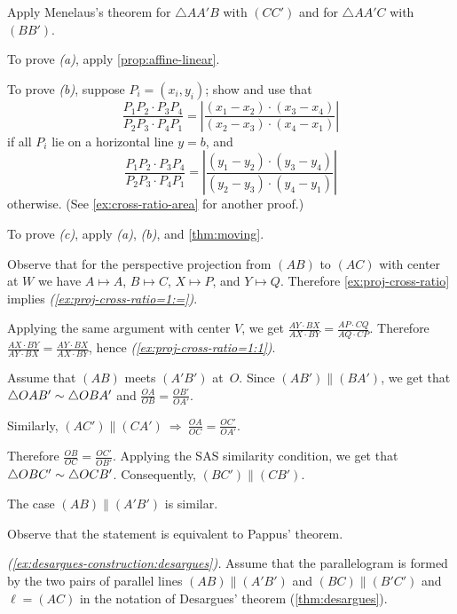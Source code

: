  Apply Menelaus's theorem
for $\triangle AA'B$ with $(CC')$
and
for $\triangle AA'C$ with $(BB')$.

\setcounter{eqtn}{0}

To prove \textit{(a)}, apply \ref{prop:affine-linear}.

To prove \textit{(b)}, suppose $P_i=(x_i,y_i)$;
show and use that 
\[\frac{P_1P_2\cdot P_3P_4}{P_2P_3\cdot P_4P_1}
=\left|\frac{(x_1-x_2)\cdot(x_3-x_4)}{(x_2-x_3)\cdot (x_4-x_1)}\right|\]
if all $P_i$ lie on a horizontal line $y=b$, and
\[\frac{P_1P_2\cdot P_3P_4}{P_2P_3\cdot P_4P_1}
=\left|\frac{(y_1-y_2)\cdot(y_3-y_4)}{(y_2-y_3)\cdot (y_4-y_1)}\right|\]
otherwise. (See \ref{ex:cross-ratio-area} for another proof.)

To prove \textit{(c)}, apply \textit{(a)}, \textit{(b)}, and \ref{thm:moving}.

Observe that for the perspective projection from $(AB)$ to $(AC)$ with center at $W$ we have
$A\mapsto A$, $B\mapsto C$, $X\mapsto P$, and $Y\mapsto Q$.
Therefore \ref{ex:proj-cross-ratio} implies \textit{(\ref{ex:proj-cross-ratio=1:=})}.

Applying the same argument with center $V$, we get  
$\frac{AY\cdot BX}{AX\cdot BY}=\frac{AP\cdot CQ}{AQ\cdot CP}$.
Therefore 
$\frac{AX\cdot BY}{AY\cdot BX}=\frac{AY\cdot BX}{AX\cdot BY}$,
hence \textit{(\ref{ex:proj-cross-ratio=1:1})}.


Assume that $(AB)$ meets $(A'B')$ at~$O$.
Since $(AB')\parallel (BA')$, we get that $\triangle OAB'\sim\triangle OBA'$
and
$\frac{OA}{OB}=\frac{OB'}{OA'}$.

Similarly, $(AC')\parallel (CA')\ \Longrightarrow\ \frac{OA}{OC}=\frac{OC'}{OA'}$.

Therefore
$\frac{OB}{OC}=\frac{OC'}{OB'}$.
Applying the SAS similarity condition, we get that
$\triangle OBC'\sim\triangle OCB'$.
Consequently, $(BC')\parallel (CB')$.

The case $(AB)\parallel(A'B')$ is similar.

 Observe that the statement is equivalent to Pappus' theorem.

\parbf{\ref{ex:desargues-construction};} \textit{(\ref{ex:desargues-construction:desargues}).}
Assume that the parallelogram is formed by the two pairs of parallel lines $(AB)\parallel (A'B')$ and $(BC)\parallel(B'C')$ and $\ell=(AC)$ in the notation of Desargues' theorem (\ref{thm:desargues}).

